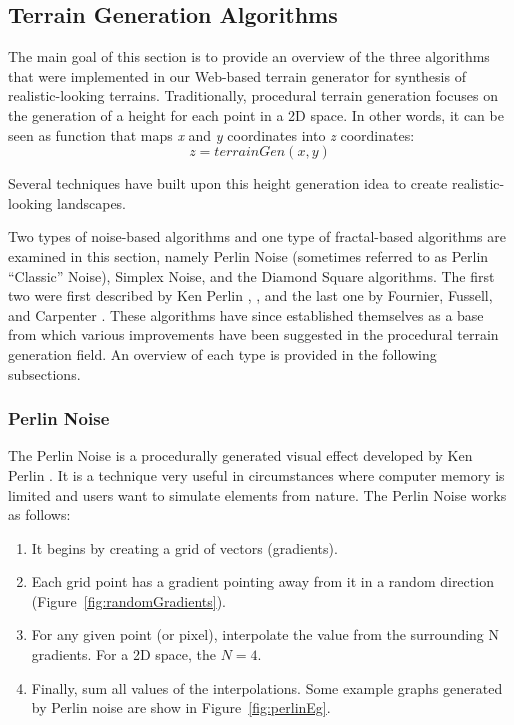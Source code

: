 \subsection{Terrain Generation Algorithms}

The main goal of this section is to provide an overview of the three algorithms that were implemented in our Web-based terrain generator for synthesis of realistic-looking terrains. Traditionally, procedural terrain generation focuses on the generation of a height for each point in a 2D space. In other words, it can be seen as function that maps \textit{x} and \textit{y} coordinates into \textit{z} coordinates: \[z=terrainGen(x, y)\]

Several techniques have built upon this height generation idea to create realistic-looking landscapes.

Two types of noise-based algorithms and one type of fractal-based algorithms are examined in this section, namely Perlin Noise (sometimes referred to as Perlin ``Classic'' Noise), Simplex Noise, and the Diamond Square algorithms. The first two were first described by Ken Perlin \cite{perlin:2002}, \cite{perlin:2001}, and the last one by Fournier, Fussell, and Carpenter \cite{fournier:1982}. These algorithms have since established themselves as a base from which various improvements have
been suggested \cite{ong:2005, lechner:2006, pi:2006, li:2006, doran:2010} in the  procedural terrain generation field. An overview of each type is provided in the following subsections. 

\subsubsection{Perlin Noise}
The Perlin Noise is a procedurally generated visual effect developed by Ken Perlin \cite{perlin:2002}. It is a technique very useful in circumstances where computer memory is limited and users want to simulate elements from nature. The Perlin Noise works as follows:

\begin{enumerate}
\item It begins by creating a grid of vectors (gradients).
\item Each grid point has a gradient pointing away from it in a random direction (Figure~\ref{fig:randomGradients}).
\item For any given point (or pixel), interpolate the value from the surrounding N gradients. For a 2D space, the $ N = 4 $.
\item Finally, sum all values of the interpolations. Some example graphs generated by Perlin noise are show in Figure~\ref{fig:perlinEg}.
\end{enumerate}


